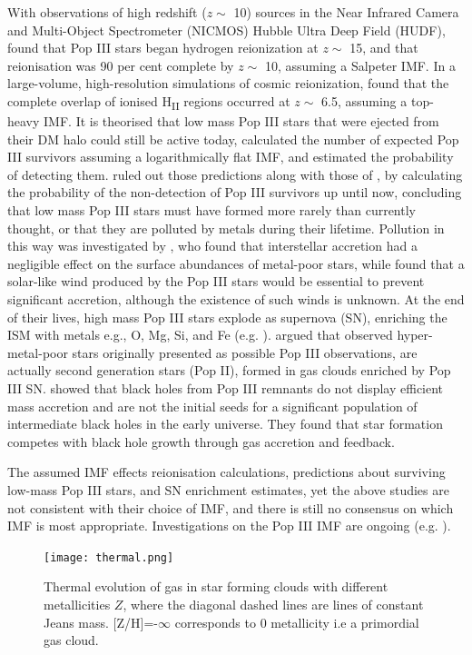 \documentclass[11pt]{article}
\begin{document}
With observations of high redshift ($z \sim$ 10) sources in the Near Infrared Camera and Multi-Object Spectrometer (NICMOS) Hubble Ultra Deep Field (HUDF), \cite{Choudhury2006} found that Pop III stars began hydrogen reionization at $z \sim$ 15, and that reionisation was 90 per cent complete by $z \sim$ 10, assuming a Salpeter IMF. In a large-volume, high-resolution simulations of cosmic reionization, \citet{Trac2007} found that the complete overlap of ionised H\textsubscript{II} regions occurred at $z \sim$ 6.5, assuming a top-heavy IMF. It is theorised that low mass Pop III stars that were ejected from their DM halo could still be active today, \cite{Hartwig2015} calculated the number of expected  Pop III survivors assuming a logarithmically flat IMF, and estimated the probability of detecting them. \cite{Magg2019} ruled out those predictions along with those of \cite{Ishiyama2016}, by calculating the probability of the non-detection  of Pop III survivors up until now, concluding that low mass Pop III stars must have formed more rarely than currently thought, or that they are polluted by metals during their lifetime. Pollution in this way was investigated by \cite{Frebel2009}, who found that interstellar accretion had a negligible effect on the surface abundances of metal-poor stars, while \cite{Johnson2011} found that a solar-like wind produced by the Pop III stars would be essential to prevent significant accretion, although the existence of such winds is unknown. At the end of their lives, high mass Pop III stars explode as supernova (SN), enriching the ISM with metals e.g., O, Mg, Si, and Fe (e.g. \citealt{Tominaga2007}). \cite{Iwamoto2005} argued that observed hyper-metal-poor stars originally presented as possible Pop III observations, are actually second generation stars (Pop II), formed in gas clouds enriched by Pop III SN. \cite{Smith2018} showed that black holes from Pop III remnants do not display efficient mass accretion and are not the initial seeds for a significant population of intermediate black holes in the early universe. They found that star formation competes with black hole growth through gas accretion and feedback. 

The assumed IMF effects reionisation calculations, predictions about surviving low-mass Pop III stars, and SN enrichment estimates, yet the above studies are not consistent with their choice of IMF, and there is still no consensus on which IMF is most appropriate. Investigations on the Pop III IMF are ongoing (e.g. \citealt{Ma2017a}).

\begin{figure}[h!]
         \centering
		\texttt{[image: thermal.png]}
		\caption{Thermal evolution of gas in star forming clouds with different metallicities $Z$, where the diagonal dashed lines are lines of constant Jeans mass. [Z/H]=-$\infty$ corresponds to 0 metallicity i.e a primordial gas cloud. \citep{Omukai2005} }
		\label{fig:thermal}
\end{figure}
\end{document}
